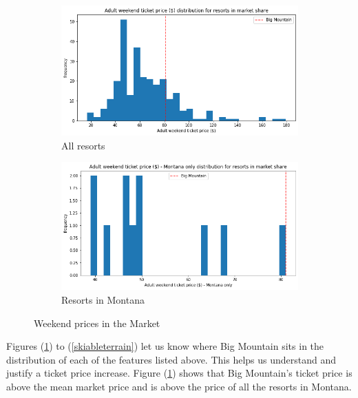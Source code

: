 \documentclass[twocolumn, 12pt]{article}
\begin{document}
\begin{figure}[h!]
	\centering
	\begin{subfigure}[b]{0.48\linewidth}
		\includegraphics[width=\linewidth]{weekendprice.png}
		\caption{All resorts}
	\end{subfigure}
	\begin{subfigure}[b]{0.48\linewidth}
		\includegraphics[width=\linewidth]{weekendpricemontana.png}
		\caption{Resorts in Montana}
	\end{subfigure}
	\caption{Weekend prices in the Market}
	\label{weekendprices}
\end{figure}

\noindent
Figures (\ref{weekendprices}) to (\ref{skiableterrain}) let us know where Big Mountain sits in the distribution of each of the features listed above. This helps us understand and justify a ticket price increase. Figure (\ref{weekendprices}) shows that Big Mountain's ticket price is above the mean market price and is above the price of all the resorts in Montana. \linebreak
\end{document}
